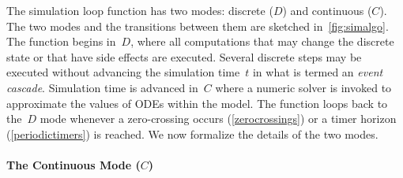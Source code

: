 \documentclass[11pt,titlepage,twoside]{report}
\newcommand{\lx}{\ensuremath{\mathit{lx}}}
\begin{document}
The simulation loop function has two modes: discrete ($D$) and continuous 
($C$).
The two modes and the transitions between them are sketched 
in~\cref{fig:simalgo}.
The function begins in~$D$, where all computations that may change the 
discrete state or that have side effects are executed.
Several discrete steps may be executed without advancing the simulation 
time~$t$ in what is termed an \emph{event cascade}.
Simulation time is advanced in~$C$ where a numeric solver is invoked to 
approximate the values of ODEs within the model.
The function loops back to the~$D$ mode whenever a zero-crossing occurs 
(\cref{zerocrossings}) or a timer horizon (\cref{periodictimers}) is 
reached.
We now formalize the details of the two modes.



\paragraph{The Continuous Mode ($C$)}
\end{document}
